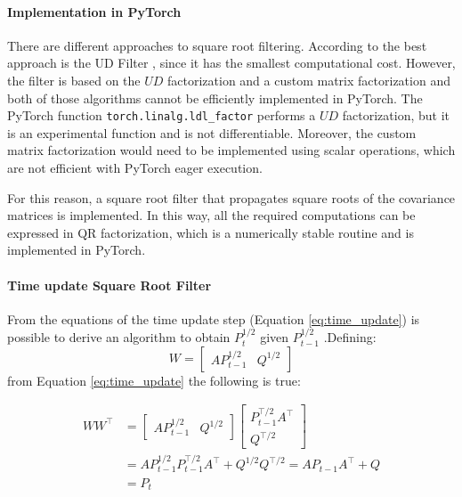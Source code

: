 \documentclass{article}
\begin{document}
\paragraph{Implementation in PyTorch}
There are different approaches to square root filtering. According to \textcite{mohinder_s_grewal_kalman_2001} the best approach is the UD Filter \cite{bierman_numerical_1977}, since it has the smallest computational cost. However, the filter is based on the $UD$ factorization and a custom matrix factorization \cite{mohinder_s_grewal_kalman_2001} and both of those algorithms cannot be efficiently implemented in \textsf{PyTorch}. The \textsf{PyTorch} function \verb|torch.linalg.ldl_factor| performs a $UD$ factorization, but it is an experimental function and is not differentiable. Moreover, the custom matrix factorization would need to be implemented using scalar operations, which are not efficient with \textsf{PyTorch} eager execution.

For this reason, a square root filter that propagates square roots of the covariance matrices is implemented. In this way, all the required computations can be expressed in QR factorization, which is a numerically stable routine and is implemented in \textsf{PyTorch}.

\paragraph{Time update Square Root Filter}

From the equations of the time update step (Equation \ref{eq:time_update}) is possible to derive an algorithm to obtain $P_t^{1/2}$ given $P_{t-1}^{1/2}$ \cite[eq. 6.60]{mohinder_s_grewal_kalman_2001}.Defining:
\begin{equation*}
    W = \begin{bmatrix}AP_{t-1}^{1/2} & Q^{1/2}\end{bmatrix}
\end{equation*}
from Equation \ref{eq:time_update} the following is true:


\begin{align*}
  WW^\top &=  \begin{bmatrix}AP_{t-1}^{1/2} & Q^{1/2}\end{bmatrix}\begin{bmatrix}P_{t-1}^{\top/2}A^\top \\ Q^{\top/2}\end{bmatrix}
  \\ &= AP_{t-1}^{1/2}P_{t-1}^{\top/2}A^\top + Q^{1/2}Q^{\top/2} = AP_{t-1}A^\top + Q\\ &= P_t
\end{align*}
\end{document}
